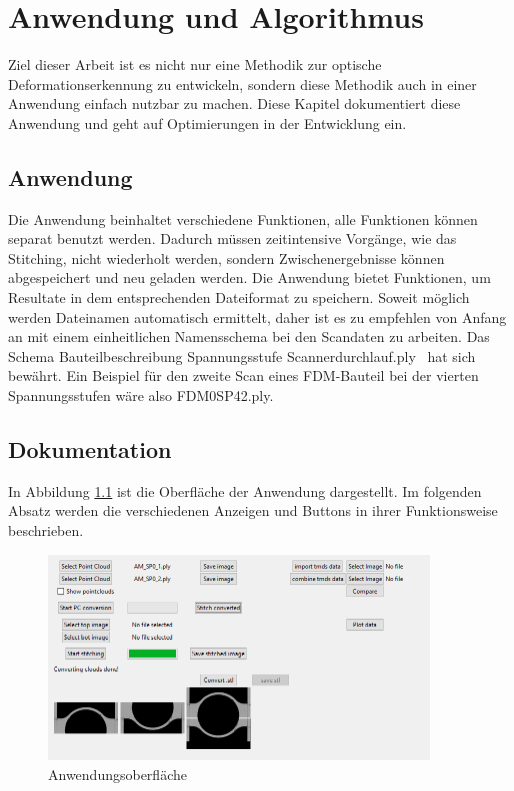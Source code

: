 
\chapter{Anwendung und Algorithmus}

Ziel dieser Arbeit ist es nicht nur eine Methodik zur optische 
Deformationserkennung zu entwickeln, sondern diese Methodik auch in einer 
Anwendung einfach nutzbar zu machen. 
Diese Kapitel dokumentiert diese Anwendung und geht auf Optimierungen 
in der Entwicklung ein.

\section{Anwendung}

Die Anwendung beinhaltet verschiedene Funktionen, alle Funktionen 
können separat benutzt werden. Dadurch müssen zeitintensive Vorgänge, wie das Stitching,
nicht wiederholt werden, sondern Zwischenergebnisse können abgespeichert und 
neu geladen werden.
Die Anwendung bietet Funktionen, um Resultate in dem entsprechenden Dateiformat zu 
speichern. Soweit möglich werden Dateinamen automatisch ermittelt, 
daher ist es zu empfehlen von Anfang an mit einem einheitlichen Namensschema bei
den Scandaten zu arbeiten. 
Das Schema \glqq Bauteilbeschreibung \textunderscore Spannungsstufe
\textunderscore Scannerdurchlauf.ply\grqq~
hat sich bewährt. Ein Beispiel für den zweite Scan eines FDM-Bauteil bei der
vierten Spannungsstufen wäre also \glqq FDM0\textunderscore SP4\textunderscore 2.ply\grqq.

\newpage
\section{Dokumentation}

In Abbildung \ref{fig:software_screenshot} ist die Oberfläche der Anwendung dargestellt.
Im folgenden Absatz werden die verschiedenen Anzeigen
und Buttons in ihrer Funktionsweise beschrieben.

\begin{figure}[H]
    \centering
    \includegraphics[width=0.9\textwidth]{images/software_screenshot2.png}
    \caption{Anwendungsoberfläche}
    \label{fig:software_screenshot}
\end{figure}

